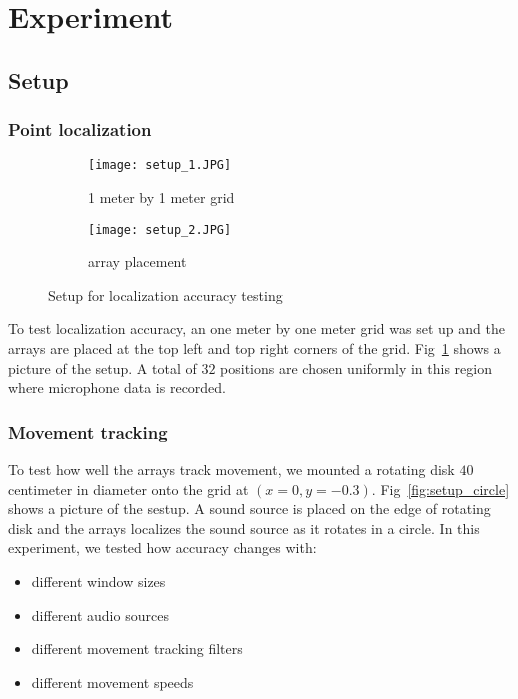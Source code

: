 \section{Experiment}
\subsection{Setup}
\subsubsection{Point localization}

\begin{figure}[]
  \centering
  \begin{subfigure}[]{.2\textwidth}
    \texttt{[image: setup\_1.JPG]}
    \caption{1 meter by 1 meter grid}
  \end{subfigure}
  \begin{subfigure}[]{.2\textwidth}
    \texttt{[image: setup\_2.JPG]}
    \caption{array placement}
  \end{subfigure}
  \caption{Setup for localization accuracy testing}
  \label{fig:setup_point}
\end{figure}

To test localization accuracy, an one meter by one meter grid was set up and the arrays are placed at the top left and top right corners of the grid. Fig~\ref{fig:setup_point} shows a picture of the setup. A total of $32$ positions are chosen uniformly in this region where microphone data is recorded.

\subsubsection{Movement tracking}
To test how well the arrays track movement, we mounted a rotating disk $40$ centimeter in diameter onto the grid at $(x=0, y=-0.3)$. Fig~\ref{fig:setup_circle} shows a picture of the sestup. A sound source is placed on the edge of rotating disk and the arrays localizes the sound source as it rotates in a circle. In this experiment, we tested how accuracy changes with:
\begin{itemize}
\item different window sizes
\item different audio sources
\item different movement tracking filters
\item different movement speeds
\end{itemize}

